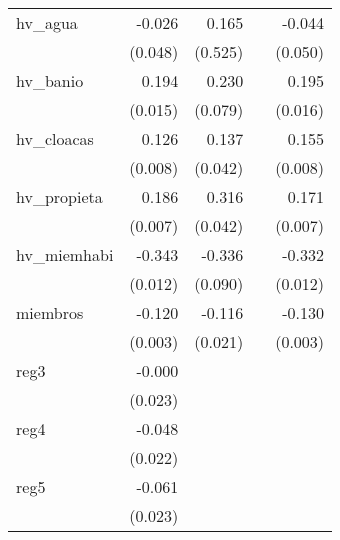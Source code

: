 {\begin{longtable}{l*{4}{D{.}{.}{-1}}}
\addlinespace
hv\_agua     &      -0.026         &       0.165         &                     &      -0.044         \\
            &     (0.048)         &     (0.525)         &                     &     (0.050)         \\
\addlinespace
hv\_banio    &       0.194\sym{***}&       0.230\sym{**} &                     &       0.195\sym{***}\\
            &     (0.015)         &     (0.079)         &                     &     (0.016)         \\
\addlinespace
hv\_cloacas  &       0.126\sym{***}&       0.137\sym{**} &                     &       0.155\sym{***}\\
            &     (0.008)         &     (0.042)         &                     &     (0.008)         \\
\addlinespace
hv\_propieta &       0.186\sym{***}&       0.316\sym{***}&                     &       0.171\sym{***}\\
            &     (0.007)         &     (0.042)         &                     &     (0.007)         \\
\addlinespace
hv\_miemhabi &      -0.343\sym{***}&      -0.336\sym{***}&                     &      -0.332\sym{***}\\
            &     (0.012)         &     (0.090)         &                     &     (0.012)         \\
\addlinespace
miembros    &      -0.120\sym{***}&      -0.116\sym{***}&                     &      -0.130\sym{***}\\
            &     (0.003)         &     (0.021)         &                     &     (0.003)         \\
\addlinespace
reg3        &      -0.000         &                     &                     &                     \\
            &     (0.023)         &                     &                     &                     \\
\addlinespace
reg4        &      -0.048\sym{*}  &                     &                     &                     \\
            &     (0.022)         &                     &                     &                     \\
\addlinespace
reg5        &      -0.061\sym{**} &                     &                     &                     \\
            &     (0.023)         &                     &                     &                     \\

\end{longtable}}
